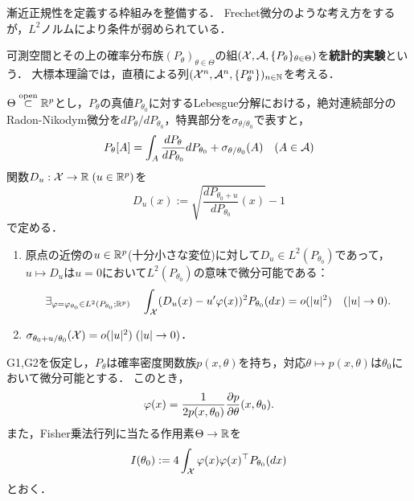 \documentclass[uplatex,dvipdfmx]{jsreport}
\begin{document}
\begin{tcolorbox}[colframe=ForestGreen, colback=ForestGreen!10!white,breakable,colbacktitle=ForestGreen!40!white,coltitle=black,fonttitle=\bfseries\sffamily,
title=]
    漸近正規性を定義する枠組みを整備する．
    Frechet微分のような考え方をするが，$L^2$ノルムにより条件が弱められている\cite{Ibragimov HasMinskii}．
\end{tcolorbox}

\begin{definition}
    可測空間とその上の確率分布族$(P_\theta)_{\theta\in\Theta}$の組$(\mathcal{X},\mathcal{A},\{P_\theta\}_{\theta\in\Theta})$を\textbf{統計的実験}という．
    大標本理論では，直積による列$(\mathcal{X}^n,\mathcal{A}^n,\{P_\theta^n\})_{n\in\mathbb{N}}$を考える．
\end{definition}

\begin{notation}[正則性の仮定]
    $\Theta\overset{\mathrm{open}}{\subset}\mathbb{R}^p$とし，$P_\theta$の真値$P_{\theta_0}$に対するLebesgue分解における，絶対連続部分のRadon-Nikodym微分を$dP_\theta/dP_{\theta_0}$，特異部分を$\sigma_{\theta/\theta_0}$で表すと，
    \[P_\theta[A]=\int_A\frac{dP_\theta}{dP_{\theta_0}}dP_{\theta_0}+\sigma_{\theta/\theta_0}(A)\quad(A\in\mathcal{A})\]
    関数$D_u:\mathcal{X}\to\mathbb{R}\;(u\in\mathbb{R}^p)$を
    \[D_u(x):=\sqrt{\frac{dP_{\theta_0+u}}{dP_{\theta_0}}(x)}-1\]
    で定める．
\end{notation}

\begin{enumerate}[({G}1)]
    \item 原点の近傍の$u\in\mathbb{R}^p$(十分小さな変位)に対して$D_u\in L^2(P_{\theta_0})$であって，$u\mapsto D_u$は$u=0$において$L^2(P_{\theta_0})$の意味で微分可能である：
    \[\exists_{\varphi=\varphi_{\theta_0}\in L^2(P_{\theta_0};\mathbb{R}^p)}\quad\int_{\mathcal{X}}(D_u(x)-u'\varphi(x))^2P_{\theta_0}(dx)=o(\lvert u\rvert^2)\quad(\lvert u\rvert\to0).\]
    \item $\sigma_{\theta_0+u/\theta_0}(\mathcal{X})=o(\lvert u\rvert^2)\;(\lvert u\rvert\to0)$．
\end{enumerate}

\begin{lemma}[$L^2$-微分の表示]
    G1,G2を仮定し，$P_\theta$は確率密度関数族$p(x,\theta)$を持ち，対応$\theta\mapsto p(x,\theta)$は$\theta_0$において微分可能とする．
    このとき，
    \[\varphi(x)=\frac{1}{2p(x,\theta_0)}\frac{\partial p}{\partial \theta}(x,\theta_0).\]
    また，Fisher乗法行列に当たる作用素$\Theta\to\mathbb{R}$を
    \[I(\theta_0):=4\int_{\mathcal{X}}\varphi(x)\varphi(x)^\top P_{\theta_0}(dx)\]
    とおく．
\end{lemma}

\begin{lemma}
    
\end{lemma}
\end{document}
